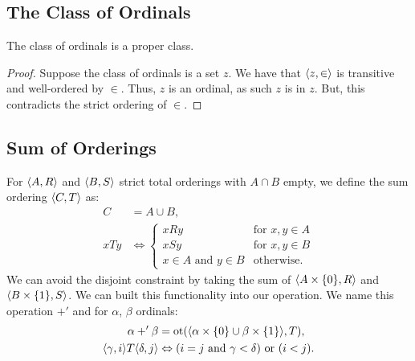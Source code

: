 \subsection{The Class of Ordinals}

The class of ordinals is a proper class.

\begin{proof}
    Suppose the class of ordinals is a set $z$.
    We have that $\langle z, \in \rangle$ is transitive and
    well-ordered by $\in$. Thus, $z$ is an ordinal,
    as such $z$ is in $z$. But, this contradicts the
    strict ordering of $\in$.
\end{proof}

\subsection{Sum of Orderings}

For $\langle A, R \rangle$ and $\langle B, S \rangle$ strict total orderings
with $A \cap B$ empty, we
define the sum ordering $\langle C, T \rangle$ as: \begin{align*}
    C &= A \cup B, \\
    x T y &\Leftrightarrow \begin{cases}
        x R y & \text{for } x, y \in A \\
        x S y & \text{for } x, y \in B \\
        x \in A \text{ and } y \in B & \text{otherwise}.
    \end{cases}
\end{align*} We can avoid the disjoint constraint by taking
the sum of $\langle A \times \{0\}, R \rangle$ and \linebreak
$\langle B \times \{1\}, S \rangle$. We can built this functionality into
our operation. We name this operation $+'$ and for $\alpha$, 
$\beta$ ordinals: \begin{align*}
    \alpha +' \beta &= \operatorname{ot}(\langle 
        \alpha \times \{0\} \cup \beta \times \{1\}
     \rangle, T), \\
    \langle \gamma, i \rangle T\langle \delta, j \rangle 
    &\Leftrightarrow (i = j \text{ and } \gamma < \delta)
    \text{ or } (i < j).
\end{align*}
